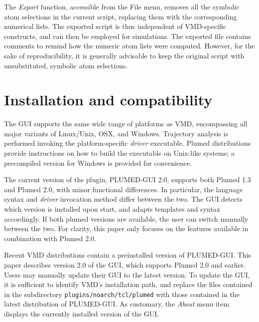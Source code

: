 \documentclass[preprint,12pt]{elsarticle}
\begin{document}
The \emph{Export} function, accessible from the File menu, removes all
the symbolic atom selections in the current script, replacing them
with the corresponding numerical lists. The exported script is thus
independent of VMD-specific constructs, and can then be employed for
simulations.  The exported file contains comments to remind how the
numeric atom lists were computed. However, for the sake of
reproducibility, it is generally advisable to keep the original
script with unsubstituted, symbolic atom selections.



\section{Installation and compatibility}

The GUI supports the same wide range of platforms as VMD, encompassing
all major variants of Linux/Unix, OSX, and Windows.  Trajectory
analysis is performed invoking the platform-specific \emph{driver}
executable. Plumed distributions provide instructions on how to build
the executable on Unix-like systems; a precompiled version for Windows
is provided for convenience.

The current version of the plugin, PLUMED-GUI 2.0, supports both
Plumed 1.3 and Plumed 2.0, with minor functional differences.  In
particular, the language syntax and \emph{driver} invocation method
differ between the two.  The GUI detects which version is installed
upon start, and adapts templates and syntax accordingly.  If both
plumed versions are available, the user can switch manually between
the two. For clarity, this paper only focuses on the features
available in combination with Plumed 2.0.

Recent VMD distributions contain a preinstalled version of PLUMED-GUI.
This paper describes version 2.0 of the GUI, which supports Plumed 2.0
and earlier.  Users may manually update their GUI to the latest
version.  To update the GUI, it is sufficient to identify VMD's
installation path, and replace the files contained in the subdirectory
\texttt{plugins/noarch/tcl/plumed} with those contained in the latest
distribution of PLUMED-GUI.  As customary, the \emph{About} menu item
displays the currently installed version of the GUI.





\end{document}
